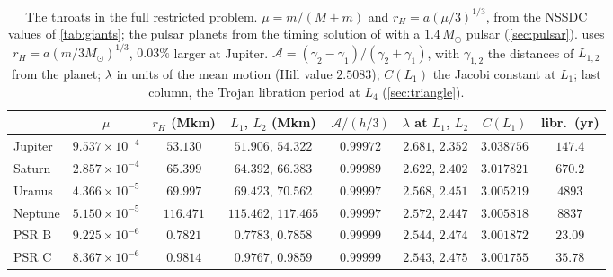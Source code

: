 \documentclass[11pt]{article}
\theoremstyle{definition}\newtheorem{definition}[theorem]{Definition}
\theoremstyle{remark}\newtheorem{remark}[theorem]{Remark}
\begin{document}
\begin{table}[!htb]\centering\footnotesize\setlength{\tabcolsep}{4pt}
\begin{tabular}{lccccccc}\toprule
 & $\mu$ & $r_H$ (Mkm) & $L_1$, $L_2$ (Mkm) & $\mathcal A/(h/3)$ & $\lambda$ at $L_1$, $L_2$ & $C(L_1)$ & libr.\ (yr) \\\midrule
Jupiter & $9.537\times10^{-4}$ & $53.130$ & $51.906$, $54.322$ & $0.99972$ & $2.681$, $2.352$ & $3.038756$ & $147.4$\\
Saturn & $2.857\times10^{-4}$ & $65.399$ & $64.392$, $66.383$ & $0.99989$ & $2.622$, $2.402$ & $3.017821$ & $670.2$\\
Uranus & $4.366\times10^{-5}$ & $69.997$ & $69.423$, $70.562$ & $0.99997$ & $2.568$, $2.451$ & $3.005219$ & $4893$\\
Neptune & $5.150\times10^{-5}$ & $116.471$ & $115.462$, $117.465$ & $0.99997$ & $2.572$, $2.447$ & $3.005818$ & $8837$\\
PSR B & $9.225\times10^{-6}$ & $0.7821$ & $0.7783$, $0.7858$ & $0.99999$ & $2.544$, $2.474$ & $3.001872$ & $23.09$\\
PSR C & $8.367\times10^{-6}$ & $0.9814$ & $0.9767$, $0.9859$ & $0.99999$ & $2.543$, $2.475$ & $3.001755$ & $35.78$\\\bottomrule
\end{tabular}
\caption{The throats in the full restricted problem. $\mu=m/(M+m)$ and $r_H=a(\mu/3)^{1/3}$, from the NSSDC values of \cref{tab:giants}; the pulsar planets from the timing solution of \cite{KW03} with a $1.4\,M_\odot$ pulsar (\cref{sec:pulsar}).  uses $r_H=a(m/3M_\odot)^{1/3}$, $0.03\%$ larger at Jupiter. $\mathcal A=(\gamma_2-\gamma_1)/(\gamma_2+\gamma_1)$, with $\gamma_{1,2}$ the distances of $L_{1,2}$ from the planet; $\lambda$ in units of the mean motion (Hill value $2.5083$); $C(L_1)$ the Jacobi constant at $L_1$; last column, the Trojan libration period at $L_4$ (\cref{sec:triangle}).}\label{tab:throats}
\end{table}
\end{document}
